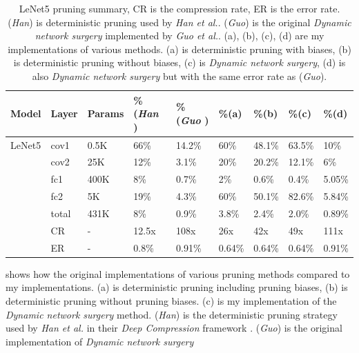 \documentclass[a4paper,12pt]{report}
\begin{document}
\begin{table}[!h]
  \centering
  \begin{tabular}{lllllllll}
    \hline
    Model   &Layer     &Params    &\%(\textit{Han} \cite{Han15})   &\%(\textit{Guo} \cite{Guo}) &\%(a)  &\%(b)    &\%(c)  &\%(d)\\
    \hline
    LeNet5  &cov1     &0.5K       &66\%               &14.2\%           &60\%   &48.1\%   &63.5\%   &10\%\\
            &cov2     &25K        &12\%               &3.1\%            &20\%   &20.2\%   &12.1\%   &6\%\\
            &fc1      &400K       &8\%                &0.7\%            &2\%    &0.6\%    &0.4\%    &5.05\%\\
            &fc2      &5K         &19\%               &4.3\%            &60\%   &50.1\%   &82.6\%   &5.84\%\\
            &total    &431K       &8\%                &0.9\%            &3.8\%  &2.4\%    &2.0\%    &0.89\%\\
    \hline

            &CR       &-          &12.5x               &108x          &26x     &42x       &49x      &111x\\
            &ER       &-          &0.8\%               &0.91\%      &0.64\%  &0.64\%    &0.64\%     &0.91\%\\
    \hline
  \end{tabular}
  \caption{LeNet5 pruning summary, CR is the compression
  rate, ER is the error rate.
  (\textit{Han}) is deterministic pruning used by \textit{Han et al.}.
  (\textit{Guo}) is the original \textit{Dynamic network surgery} implemented by \textit{Guo et al.}.
  (a), (b), (c), (d) are my implementations of various methods.
  (a) is deterministic pruning with biases, (b) is
  deterministic pruning without biases, (c) is \textit{Dynamic network surgery}, (d) is
  also \textit{Dynamic network surgery} but with the same error rate as (\textit{Guo}).}
  \label{fig:prune_org_summary}
\end{table}
 shows how the original implementations of various
pruning methods compared to my implementations.
(a) is deterministic pruning including pruning biases, (b) is deterministic
pruning without pruning biases.
(c) is my implementation of the \textit{Dynamic network surgery} method.
(\textit{Han}) is the deterministic pruning strategy used by \textit{Han et al.}
in their \textit{Deep Compression} framework \cite{Han15}.
(\textit{Guo}) is the original implementation of \textit{Dynamic network surgery}
\end{document}
